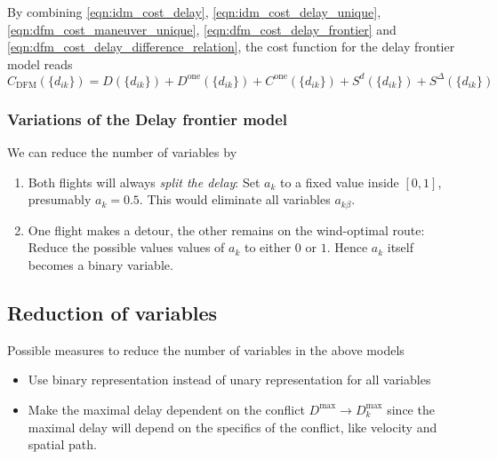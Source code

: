 \documentclass{article}
\begin{document}
By combining \eqref{eqn:idm_cost_delay}, \eqref{eqn:idm_cost_delay_unique}, \eqref{eqn:dfm_cost_maneuver_unique}, \eqref{eqn:dfm_cost_delay_frontier} and \eqref{eqn:dfm_cost_delay_difference_relation}, the cost function for the delay frontier model reads
\begin{equation*}
    C_\text{DFM}(\{d_{ik}\})  = D(\{d_{ik}\}) + D^\text{one}(\{d_{ik}\}) + C^\text{one}(\{d_{ik}\}) + S^d(\{d_{ik}\}) + S^\Delta(\{d_{ik}\})
\end{equation*}
\subsubsection{Variations of the Delay frontier model}
We can reduce the number of variables by
\begin{enumerate}
    \item Both flights will always \textit{split the delay}: Set $a_k$ to a fixed value inside $[0, 1]$, presumably $a_k = 0.5$. This would eliminate all variables $a_{k\beta}$.
    \item One flight makes a detour, the other remains on the wind-optimal route: Reduce the possible values values of $a_k$ to either $0$ or $1$. Hence $a_k$ itself becomes a binary variable.
\end{enumerate}


\subsection{Reduction of variables}
Possible measures to reduce the number of variables in the above models
\begin{itemize}
    \item Use binary representation instead of unary representation for all variables
    \item Make the maximal delay dependent on the conflict $D^\text{max} \to D^\text{max}_k$ since the maximal delay will depend on the specifics of the conflict, like velocity and spatial path.
\end{itemize}
\end{document}
